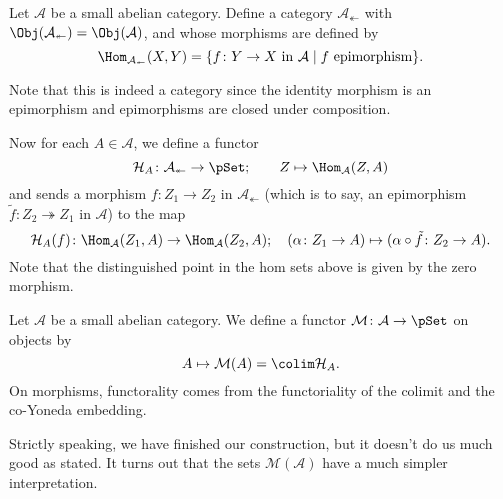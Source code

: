 \documentclass[main.tex]{subfiles}
\begin{document}
\begin{definition}
  \label{def:category_of_contravariant_epimorphisms}
  Let $\mathcal{A}$ be a small abelian category. Define a category $\mathcal{A}_{\twoheadleftarrow}$ with $\Obj(\mathcal{A}_{\twoheadleftarrow}) = \Obj(\mathcal{A})$, and whose morphisms are defined by
  \begin{equation*}
    \Hom_{\mathcal{A}_{\twoheadleftarrow}}(X, Y) = \{f\colon Y \to X \text{ in }\mathcal{A}\mid f \text{ epimorphism}\}.
  \end{equation*}
\end{definition}

Note that this is indeed a category since the identity morphism is an epimorphism and epimorphisms are closed under composition.

Now for each $A \in \mathcal{A}$, we define a functor
\begin{equation*}
  \mathcal{H}_{A}\colon \mathcal{A}_{\twoheadleftarrow} \to \pSet;\qquad Z \mapsto \Hom_{\mathcal{A}}(Z, A)
\end{equation*}
and sends a morphism $f\colon Z_{1} \to Z_{2}$ in $\mathcal{A}_{\twoheadleftarrow}$ (which is to say, an epimorphism $\tilde{f}\colon Z_{2} \twoheadrightarrow Z_{1}$ in $\mathcal{A}$) to the map
\begin{equation*}
  \mathcal{H}_{A}(f)\colon \Hom_{\mathcal{A}}(Z_{1}, A) \to \Hom_{\mathcal{A}}(Z_{2}, A);\quad (\alpha\colon Z_{1} \to A) \mapsto (\alpha \circ \tilde{f}\colon Z_{2} \to A).
\end{equation*}
Note that the distinguished point in the hom sets above is given by the zero morphism.

\begin{definition}
  \label{def:member_functor}
  Let $\mathcal{A}$ be a small abelian category. We define a functor $\mathcal{M}\colon \mathcal{A} \to \pSet$ on objects by
  \begin{equation*}
    A \mapsto \mathcal{M}(A) = \colim \mathcal{H}_{A}.
  \end{equation*}
  On morphisms, functorality comes from the functoriality of the colimit and the co-Yoneda embedding.
\end{definition}

Strictly speaking, we have finished our construction, but it doesn't do us much good as stated. It turns out that the sets $\mathcal{M}(\mathcal{A})$ have a much simpler interpretation.
\end{document}

